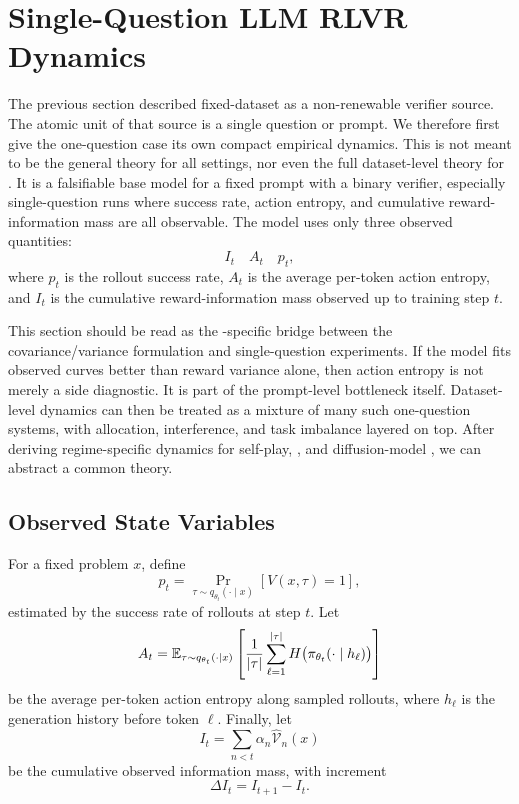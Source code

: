\section{Single-Question LLM RLVR Dynamics}

The previous section described fixed-dataset \llm{} \rlvr{} as a non-renewable verifier source. The atomic unit of that source is a single question or prompt. We therefore first give the one-question case its own compact empirical dynamics. This is not meant to be the general theory for all \rlvr{} settings, nor even the full dataset-level theory for \llm{} \rlvr{}. It is a falsifiable base model for a fixed prompt with a binary verifier, especially single-question runs where success rate, action entropy, and cumulative reward-information mass are all observable. The model uses only three observed quantities:
\[
  I_t
  \quad
  A_t
  \quad
  p_t,
\]
where $p_t$ is the rollout success rate, $A_t$ is the average per-token action entropy, and $I_t$ is the cumulative reward-information mass observed up to training step $t$.

This section should be read as the \llm{}-specific bridge between the covariance/variance formulation and single-question experiments. If the model fits observed curves better than reward variance alone, then action entropy is not merely a side diagnostic. It is part of the prompt-level \llm{} bottleneck itself. Dataset-level \llm{} dynamics can then be treated as a mixture of many such one-question systems, with allocation, interference, and task imbalance layered on top. After deriving regime-specific dynamics for self-play, \llm{} \rlvr{}, and diffusion-model \rlvr{}, we can abstract a common theory.

\subsection{Observed State Variables}

For a fixed problem $x$, define
\[
  p_t
  =
  \Pr_{\tau\sim q_{\theta_t}(\cdot\mid x)}
  [V(x,\tau)=1],
\]
estimated by the success rate of rollouts at step $t$. Let
\[
  A_t
  =
  \mathbb{E}_{\tau\sim q_{\theta_t}(\cdot\mid x)}
  \left[
    \frac{1}{|\tau|}
    \sum_{\ell=1}^{|\tau|}
    H\big(\pi_{\theta_t}(\cdot\mid h_\ell)\big)
  \right]
\]
be the average per-token action entropy along sampled rollouts, where $h_\ell$ is the generation history before token $\ell$. Finally, let
\[
  I_t
  =
  \sum_{n<t}
  \alpha_n \widehat{\mathcal{V}}_n(x)
\]
be the cumulative observed information mass, with increment
\[
  \Delta I_t=I_{t+1}-I_t.
\]

